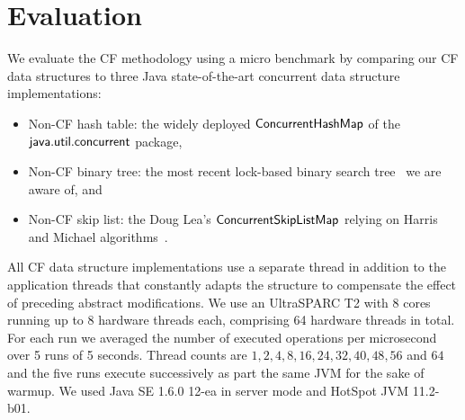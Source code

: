 {%
%

}

\section{Evaluation}\label{sec:expe}

We evaluate the CF methodology using a micro benchmark by comparing our CF data structures to three Java state-of-the-art concurrent data structure implementations: 
\begin{itemize}\itemsep2pt
	\item Non-CF hash table: the widely deployed $\lit{ConcurrentHashMap}$ of the $\lit{java.util.concurrent}$ package, 
	\item Non-CF binary tree: the most recent lock-based binary search tree~\cite{BCCO10} we are aware of, and 
	\item Non-CF skip list: the Doug Lea's $\lit{ConcurrentSkipListMap}$ relying on Harris and Michael algorithms~\cite{Har01,Mic02}.
\end{itemize}
All CF data structure implementations use a separate thread in addition to the application threads that constantly adapts the structure to compensate the effect of preceding abstract modifications.
We use an UltraSPARC T2 with 8 cores running up to 8 hardware threads each, comprising 64 hardware threads in total. 
For each run we averaged the number of
executed operations per microsecond over 5
runs of 5 seconds. Thread counts are $1,2,4,8,16,24,32,40,48,56$ and $64$ and the five runs execute successively as part the same JVM for the sake of warmup.
We used Java SE 1.6.0 12-ea in server mode and HotSpot JVM 11.2-b01. 


